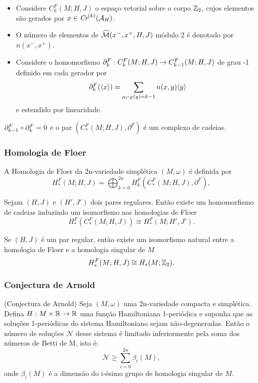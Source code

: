 \documentclass{beamer}
\begin{document}
\begin{footnotesize}
\begin{frame}
\begin{itemize}
				\item Considere  $C^{F}_{k}(M;H,J)$ o espaço vetorial sobre o corpo $\mathbb{Z}_{2}$, cujos elementos são gerados por $x \in \textit{Cr}^{(k)}(\mathcal{A}_{H}) $.
				
				\item O número de elementos de $\widehat{\mathcal{M}}(x^{-}, x^{+}, H, J)$ módulo 2 é denotado por $n(x^{-},x^{+})$.
				
				\item 
				Considere o homomorfismo $\partial_{k}^{F}: C^{F}_{k}(M;H,J)\to C^{F}_{k-1}(M;H,J)$ de grau -1 definido em cada gerador por
				$$
				\partial_{k}^{F}(\langle x\rangle) = \sum_{\mu_{CZ}(y)=k-1}n(x,y)\langle y\rangle
				$$
				e estendido por linearidade. 
				
			\end{itemize}
		
		\begin{teorema}
			 $\partial_{k-1}^{F}\circ\partial_{k}^{F} = 0$ e o par $(C^{F}_{*}(M;H,J), \partial^{F})$ é um complexo de cadeias.
		\end{teorema}
	\end{frame}
	
		\begin{frame}
		\frametitle{Homologia de Floer}
			A Homologia de Floer da 2n-variedade simplética $(M,\omega)$ é definida por 
			$$
			H^{F}_{*}(M;H,J)=\bigoplus_{k=0}^{2n}H^{F}_{k}(C^{F}_{*}(M;H,J), \partial^{F}),
			$$
			
			\begin{teorema}
				Sejam $(H,J)$ e $(H',J')$ dois pares regulares. Então existe um homomorfismo de cadeias induzindo um isomorfismo nas homologias de Floer
				$$
				H^{F}_{*}(C^{F}_{*}(M;H,J)) \cong H^{F}_{*}(M; H',J'). 
				$$
			\end{teorema}
			
			\begin{teorema}\label{teorema_isomorfismo_homologia_floer}
				Se $(H,J)$ é um par regular, então 
				existe um isomorfismo natural entre a homologia de Floer e a homologia singular de $M$
				$$
				H^{F}_{*}(M;H,J) \cong H_{*}(M;\mathbb{Z}_{2}). 
				$$
				
			\end{teorema}
			
	\end{frame}
	
	\begin{frame}
		\frametitle{Conjectura de Arnold}
		
			\begin{teorema}
				(Conjectura de Arnold) Seja $(M,\omega)$ uma 2n-variedade compacta e simplética. Defina $H:M\times \mathbb{R}^{} \to \mathbb{R}^{}$ uma função Hamiltoniana 1-periódica e suponha que as soluções 1-periódicas do sistema Hamiltoniano sejam não-degeneradas. Então o número de soluções $\mathcal{N}$ desse sistema é limitado inferiormente pela soma dos números de Betti de M, isto é:
				$$
				\mathcal{N}\geq \sum_{i=0}^{2n}\beta_{i}(M),
				$$
				onde $\beta_{i}(M)$ é a dimensão do i-ésimo grupo de homologia singular de $M$.
			\end{teorema}
	\end{frame}
	

\end{footnotesize}
\end{document}
